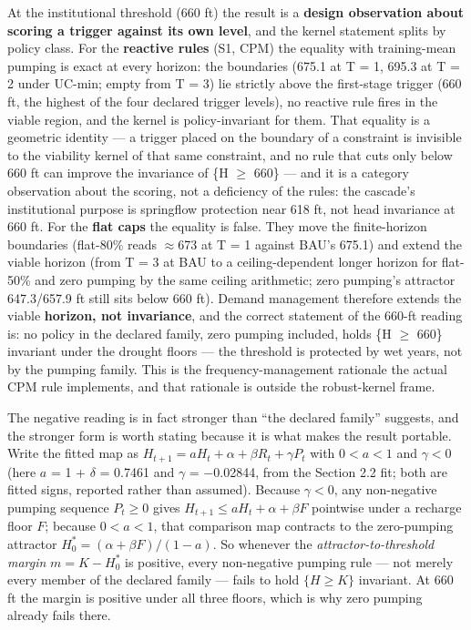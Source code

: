 \documentclass[11pt]{article}
\begin{document}
At the institutional threshold (660 ft) the result is a \textbf{design
observation about scoring a trigger against its own level}, and the
kernel statement splits by policy class. For the \textbf{reactive rules}
(S1, CPM) the equality with training-mean pumping is exact at every
horizon: the boundaries (675.1 at T = 1, 695.3 at T = 2 under UC-min;
empty from T = 3) lie strictly above the first-stage trigger (660 ft,
the highest of the four declared trigger levels), no reactive rule fires
in the viable region, and the kernel is policy-invariant for them. That
equality is a geometric identity --- a trigger placed on the boundary of
a constraint is invisible to the viability kernel of that same
constraint, and no rule that cuts only below 660 ft can improve the
invariance of \{H \ensuremath{\geq} 660\} --- and it is a category observation about the
scoring, not a deficiency of the rules: the cascade's institutional
purpose is springflow protection near 618 ft, not head invariance at 660
ft. For the \textbf{flat caps} the equality is false. They move the
finite-horizon boundaries (flat-80\% reads \ensuremath{\approx}673 at T = 1 against BAU's
675.1) and extend the viable horizon (from T = 3 at BAU to a ceiling-dependent longer horizon for flat-50\%
and zero pumping by the same ceiling arithmetic;
zero pumping's attractor 647.3/657.9 ft still sits below 660 ft). Demand
management therefore extends the viable \textbf{horizon, not
invariance}, and the correct statement of the 660-ft reading is: no
policy in the declared family, zero pumping included, holds \{H \ensuremath{\geq} 660\}
invariant under the drought floors --- the threshold is protected by wet
years, not by the pumping family. This is the frequency-management
rationale the actual CPM rule implements, and that rationale is outside
the robust-kernel frame.

The negative reading is in fact stronger than ``the declared family''
suggests, and the stronger form is worth stating because it is what
makes the result portable. Write the fitted map as \(H_{t+1} = aH_t +
\alpha + \beta R_t + \gamma P_t\) with \(0 < a < 1\) and \(\gamma < 0\)
(here \(a\) = 1 + \(\delta\) = 0.7461 and \(\gamma\) = \ensuremath{-}0.02844, from the
Section 2.2 fit; both are fitted signs, reported rather than assumed). Because \(\gamma < 0\), any
non-negative pumping sequence \(P_t \geq 0\) gives \(H_{t+1} \leq aH_t +
\alpha + \beta F\) pointwise under a recharge floor \(F\); because \(0 < a
< 1\), that comparison map contracts to the zero-pumping attractor
\(H^{\ast}_0 = (\alpha + \beta F)/(1-a)\). So whenever the
\emph{attractor-to-threshold margin} \(m = K - H^{\ast}_0\) is positive,
every non-negative pumping rule --- not merely every member of the
declared family --- fails to hold \(\{H \geq K\}\) invariant. At 660 ft
the margin is positive under all three floors, which is why zero pumping
already fails there.
\end{document}
